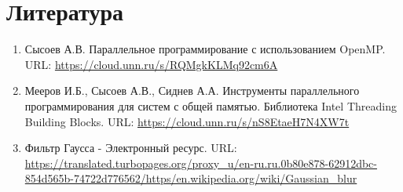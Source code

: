\documentclass{report}
\begin{document}
\section*{Литература}
\begin{enumerate}
\item Сысоев А.В. Параллельное программирование с использованием OpenMP. URL: \newline
\url{https://cloud.unn.ru/s/RQMgkKLMq92cm6A}
\item Мееров И.Б., Сысоев А.В., Сиднев А.А. Инструменты параллельного программирования для систем с общей памятью. Библиотека Intel Threading Building Blocks. URL: \newline
\url{https://cloud.unn.ru/s/nS8EtaeH7N4XW7t}
\item Фильтр Гаусса - Электронный ресурс. URL: \newline
\url{https://translated.turbopages.org/proxy_u/en-ru.ru.0b80e878-62912dbc-854d565b-74722d776562/https/en.wikipedia.org/wiki/Gaussian_blur}
\end{enumerate}
\newpage

\end{document}

